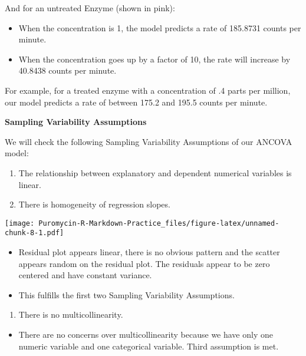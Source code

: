 \documentclass[
]{article}
\providecommand{\tightlist}{%
  \setlength{\itemsep}{0pt}\setlength{\parskip}{0pt}}
\begin{document}
And for an untreated Enzyme (shown in pink):

\begin{itemize}
\tightlist
\item
  When the concentration is 1, the model predicts a rate of 185.8731
  counts per minute.
\item
  When the concentration goes up by a factor of 10, the rate will
  increase by 40.8438 counts per minute.
\end{itemize}

For example, for a treated enzyme with a concentration of .4 parts per
million, our model predicts a rate of between 175.2 and 195.5 counts per
minute.

\textbf{Sampling Variability Assumptions}

We will check the following Sampling Variability Assumptions of our
ANCOVA model:

\begin{enumerate}
\def\labelenumi{\arabic{enumi}.}
\item
  The relationship between explanatory and dependent numerical variables
  is linear.
\item
  There is homogeneity of regression slopes.
\end{enumerate}

\texttt{[image: Puromycin-R-Markdown-Practice\_files/figure-latex/unnamed-chunk-8-1.pdf]}

\begin{itemize}
\tightlist
\item
  Residual plot appears linear, there is no obvious pattern and the
  scatter appears random on the residual plot. The residuals appear to
  be zero centered and have constant variance.
\item
  This fulfills the first two Sampling Variability Assumptions.
\end{itemize}

\begin{enumerate}
\def\labelenumi{\arabic{enumi}.}
\setcounter{enumi}{2}
\tightlist
\item
  There is no multicollinearity.
\end{enumerate}

\begin{itemize}
\tightlist
\item
  There are no concerns over multicollinearity because we have only one
  numeric variable and one categorical variable. Third assumption is
  met.
\end{itemize}
\end{document}
